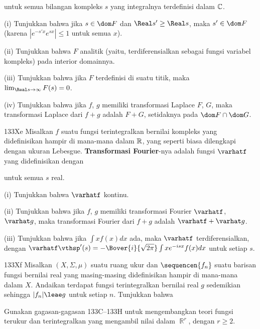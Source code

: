 {\noindent untuk semua bilangan kompleks $s$ yang integralnya terdefinisi
dalam $\Bbb C$.

\quad(i) Tunjukkan bahwa jika $s\in\dom F$ dan $\Real s'\ge\Real s$, maka
$s'\in\dom F$ (karena $|e^{-s'x}e^{sx}|\le 1$ untuk semua $x$).

\quad(ii) Tunjukkan bahwa $F$ analitik (yaitu, terdiferensialkan sebagai
fungsi variabel kompleks) pada interior domainnya. 

\quad(iii) Tunjukkan bahwa jika $F$ terdefinisi di suatu titik, maka
$\lim_{\Real s\to\infty}F(s)=0$.

\quad(iv) Tunjukkan bahwa jika $f$, $g$ memiliki transformasi Laplace $F$,
$G$, maka transformasi Laplace dari $f+g$ adalah $F+G$, setidaknya pada
$\dom F\cap \dom G$.

\sqheader 133Xe Misalkan $f$ suatu fungsi terintegralkan bernilai kompleks
yang didefinisikan hampir di mana-mana dalam $\Bbb R$, yang seperti biasa
dilengkapi dengan ukuran Lebesgue. {\bf Transformasi Fourier}-nya adalah
fungsi $\varhatf$ yang didefinisikan dengan


\noindent untuk semua $s$ real.

\quad(i) Tunjukkan bahwa $\varhatf$ kontinu. 

\quad(ii) Tunjukkan bahwa jika $f$, $g$ memiliki transformasi Fourier
$\varhatf$, $\varhat g$, maka transformasi Fourier dari $f+g$ adalah
$\varhatf+\varhat g$.

\quad(iii) Tunjukkan bahwa jika $\int xf(x)dx$ ada, maka $\varhatf$
terdiferensialkan, dengan
$\varhatf\vthsp'(s)=-\Bover{i}{\sqrt{2\pi}}\int xe^{-isx}f(x)dx$ untuk
setiap $s$.

\spheader 133Xf Misalkan $(X,\Sigma,\mu)$ suatu ruang ukur dan
$\sequencen{f_n}$ suatu barisan fungsi bernilai real yang masing-masing
didefinisikan hampir di mana-mana dalam $X$. Andaikan terdapat fungsi
terintegralkan bernilai real $g$ sedemikian sehingga $|f_n|\leae g$ untuk
setiap $n$. Tunjukkan bahwa



Gunakan gagasan-gagasan 133C–133H untuk mengembangkan teori fungsi terukur
dan terintegralkan yang mengambil nilai dalam $\BbbR^r$, dengan $r\ge 2$.

}

